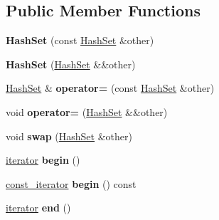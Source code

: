 \subsection*{Public Member Functions}
\begin{DoxyCompactItemize}
\item 
\hypertarget{classemlib_1_1_hash_set_a87fa5a0e8c20851419f431914c0ddede}{{\bfseries Hash\+Set} (const \hyperlink{classemlib_1_1_hash_set}{Hash\+Set} \&other)}\label{classemlib_1_1_hash_set_a87fa5a0e8c20851419f431914c0ddede}

\item 
\hypertarget{classemlib_1_1_hash_set_a43fa2ae4c3c6a20c79cd08f4f0d8cef7}{{\bfseries Hash\+Set} (\hyperlink{classemlib_1_1_hash_set}{Hash\+Set} \&\&other)}\label{classemlib_1_1_hash_set_a43fa2ae4c3c6a20c79cd08f4f0d8cef7}

\item 
\hypertarget{classemlib_1_1_hash_set_afa121d14a8d0c35502721a5f48facca3}{\hyperlink{classemlib_1_1_hash_set}{Hash\+Set} \& {\bfseries operator=} (const \hyperlink{classemlib_1_1_hash_set}{Hash\+Set} \&other)}\label{classemlib_1_1_hash_set_afa121d14a8d0c35502721a5f48facca3}

\item 
\hypertarget{classemlib_1_1_hash_set_a798bb959a0415044c305a9c788f56101}{void {\bfseries operator=} (\hyperlink{classemlib_1_1_hash_set}{Hash\+Set} \&\&other)}\label{classemlib_1_1_hash_set_a798bb959a0415044c305a9c788f56101}

\item 
\hypertarget{classemlib_1_1_hash_set_accda9f7cf30f0273c94a15653875b8df}{void {\bfseries swap} (\hyperlink{classemlib_1_1_hash_set}{Hash\+Set} \&other)}\label{classemlib_1_1_hash_set_accda9f7cf30f0273c94a15653875b8df}

\item 
\hypertarget{classemlib_1_1_hash_set_acc670a2060e9fc6120676187f588ffd2}{\hyperlink{classemlib_1_1_hash_set_1_1iterator}{iterator} {\bfseries begin} ()}\label{classemlib_1_1_hash_set_acc670a2060e9fc6120676187f588ffd2}

\item 
\hypertarget{classemlib_1_1_hash_set_a1f6903e28b8fe2724903275ab8c455b3}{\hyperlink{classemlib_1_1_hash_set_1_1const__iterator}{const\+\_\+iterator} {\bfseries begin} () const }\label{classemlib_1_1_hash_set_a1f6903e28b8fe2724903275ab8c455b3}

\item 
\hypertarget{classemlib_1_1_hash_set_a9e30e5ca74667cc5b8288ec423f7ab59}{\hyperlink{classemlib_1_1_hash_set_1_1iterator}{iterator} {\bfseries end} ()}\label{classemlib_1_1_hash_set_a9e30e5ca74667cc5b8288ec423f7ab59}


\end{DoxyCompactItemize}
